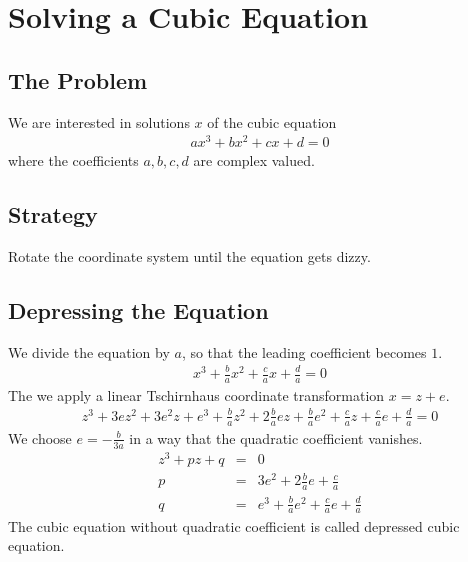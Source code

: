 \documentclass[12pt,a4paper,twoside,openright,BCOR10mm,headsepline,titlepage,abstracton,chapterprefix,final]{scrreprt}
\begin{document}
\section{Solving a Cubic Equation}

\subsection{The Problem}
We are interested in solutions $x$ of the cubic equation
\begin{eqnarray}
 a x^3 + b x^2 + c x + d = 0
\end{eqnarray}
where the coefficients $a,b,c,d$ are complex valued.

\subsection{Strategy}
Rotate the coordinate system until the equation gets dizzy.

\subsection{Depressing the Equation}
We divide the equation by $a$, so that the leading coefficient becomes $1$.
\begin{eqnarray}
 x^3 + \frac{b}{a} x^2 + \frac{c}{a} x + \frac{d}{a} = 0
\end{eqnarray}
The we apply a linear Tschirnhaus coordinate transformation $x = z + e$.
\begin{eqnarray}
z^3 + 3 e z^2 + 3 e^2 z + e^3 +
\frac{b}{a} z^2 + 2 \frac{b}{a} ez + \frac{b}{a} e^2 +
\frac{c}{a} z + \frac{c}{a} e +
\frac{d}{a}
= 0
\end{eqnarray}
We choose $e = -\frac{b}{3a}$ in a way that the quadratic coefficient vanishes.
\begin{eqnarray}
z^3 + p z + q &=& 0 \label{eq:cubic_depressed}
\\
p &=& 3 e^2 + 2 \frac{b}{a} e + \frac{c}{a}
\\
q &=& e^3 + \frac{b}{a} e^2 + \frac{c}{a} e + \frac{d}{a}
\end{eqnarray}
The cubic equation without quadratic coefficient is called depressed cubic equation.
\end{document}
